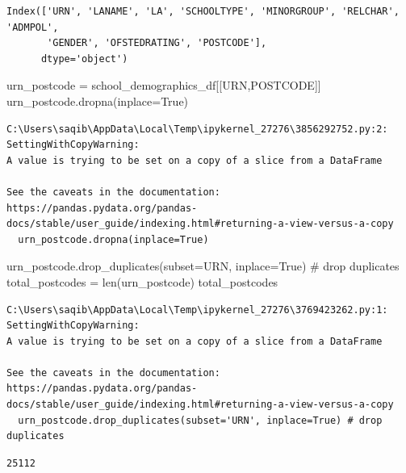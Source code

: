 \documentclass[
  letterpaper,
  DIV=11,
  numbers=noendperiod]{scrartcl}
\newenvironment{Shaded}{\begin{snugshade}}{\end{snugshade}}
\newcommand{\BuiltInTok}[1]{\textcolor[rgb]{0.00,0.23,0.31}{#1}}
\newcommand{\CommentTok}[1]{\textcolor[rgb]{0.37,0.37,0.37}{#1}}
\newcommand{\NormalTok}[1]{\textcolor[rgb]{0.00,0.23,0.31}{#1}}
\newcommand{\OperatorTok}[1]{\textcolor[rgb]{0.37,0.37,0.37}{#1}}
\newcommand{\StringTok}[1]{\textcolor[rgb]{0.13,0.47,0.30}{#1}}
\newcommand{\VariableTok}[1]{\textcolor[rgb]{0.07,0.07,0.07}{#1}}
\begin{document}
\begin{verbatim}
Index(['URN', 'LANAME', 'LA', 'SCHOOLTYPE', 'MINORGROUP', 'RELCHAR', 'ADMPOL',
       'GENDER', 'OFSTEDRATING', 'POSTCODE'],
      dtype='object')
\end{verbatim}

\begin{Shaded}
\begin{Highlighting}[]
\NormalTok{urn\_postcode }\OperatorTok{=}\NormalTok{ school\_demographics\_df[[}\StringTok{\textquotesingle{}URN\textquotesingle{}}\NormalTok{,}\StringTok{\textquotesingle{}POSTCODE\textquotesingle{}}\NormalTok{]]}
\NormalTok{urn\_postcode.dropna(inplace}\OperatorTok{=}\VariableTok{True}\NormalTok{)}
\end{Highlighting}
\end{Shaded}

\begin{verbatim}
C:\Users\saqib\AppData\Local\Temp\ipykernel_27276\3856292752.py:2: SettingWithCopyWarning: 
A value is trying to be set on a copy of a slice from a DataFrame

See the caveats in the documentation: https://pandas.pydata.org/pandas-docs/stable/user_guide/indexing.html#returning-a-view-versus-a-copy
  urn_postcode.dropna(inplace=True)
\end{verbatim}

\begin{Shaded}
\begin{Highlighting}[]
\NormalTok{urn\_postcode.drop\_duplicates(subset}\OperatorTok{=}\StringTok{\textquotesingle{}URN\textquotesingle{}}\NormalTok{, inplace}\OperatorTok{=}\VariableTok{True}\NormalTok{) }\CommentTok{\# drop duplicates}
\NormalTok{total\_postcodes }\OperatorTok{=} \BuiltInTok{len}\NormalTok{(urn\_postcode)}
\NormalTok{total\_postcodes}
\end{Highlighting}
\end{Shaded}

\begin{verbatim}
C:\Users\saqib\AppData\Local\Temp\ipykernel_27276\3769423262.py:1: SettingWithCopyWarning: 
A value is trying to be set on a copy of a slice from a DataFrame

See the caveats in the documentation: https://pandas.pydata.org/pandas-docs/stable/user_guide/indexing.html#returning-a-view-versus-a-copy
  urn_postcode.drop_duplicates(subset='URN', inplace=True) # drop duplicates
\end{verbatim}

\begin{verbatim}
25112
\end{verbatim}
\end{document}
